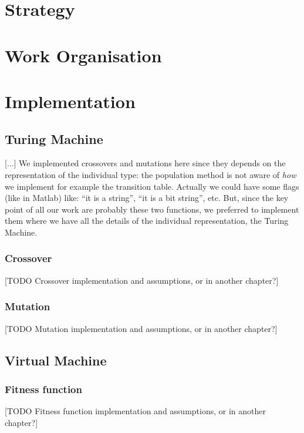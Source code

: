 \documentclass{report}
\begin{document}
\chapter{Strategy}
\label{chap:strategy}

\chapter{Work Organisation}
\label{chap:wo}

\chapter{Implementation}
\label{chap:impl}

\section{Turing Machine}
[...]
We implemented crossovers and mutations here since they depends on the representation of the individual type: the population method is not aware of \textit{how} we implement for example the transition table. Actually we could have some flags (like in Matlab) like: ``it is a string'', ``it is a bit string'', etc. But, since the key point of all our work are probably these two functions, we preferred to implement them where we have all the details of the individual representation, the Turing Machine.

\subsection{Crossover}
\label{sec:crossover}
[TODO Crossover implementation and assumptions, or in another chapter?]

\subsection{Mutation}
\label{sec:mutation}
[TODO Mutation implementation and assumptions, or in another chapter?]


\section{Virtual Machine}

\subsection{Fitness function}
\label{sec:fitness}
[TODO Fitness function implementation and assumptions, or in another chapter?]
\end{document}
